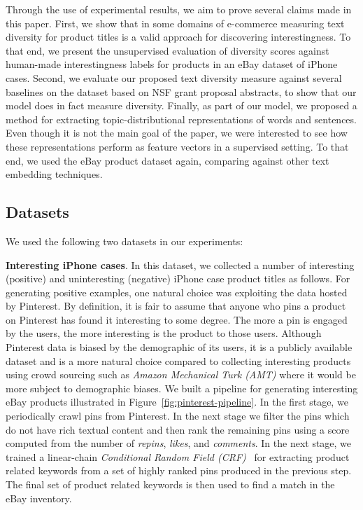

Through the use of experimental results, we aim to prove several
claims made in this paper. First, we show that in some domains of
e-commerce measuring text diversity for product titles is a valid
approach for discovering interestingness. To that end, we present the
unsupervised evaluation of diversity scores against human-made
interestingness labels for products in an eBay dataset of iPhone
cases. Second, we evaluate our proposed text diversity measure against
several baselines on the dataset based on NSF grant proposal
abstracts, to show that our model does in fact measure
diversity. Finally, as part of our model, we proposed a method for
extracting topic-distributional representations of words and
sentences. Even though it is not the main goal of the paper, we were
interested to see how these representations perform as feature vectors
in a supervised setting. To that end, we used the eBay product
dataset again, comparing against other text embedding techniques.

\subsection{Datasets}
\label{sec:datasets}

We used the following two datasets in our experiments: 

{\bf Interesting iPhone cases}.
In this dataset, we collected a number of interesting (positive) and uninteresting (negative) iPhone case product titles as follows. For generating positive examples, one natural choice was exploiting the data hosted by Pinterest. By definition, it is fair to assume that anyone who pins a product on Pinterest has found it interesting to some degree. The more a pin is engaged by the users, the more interesting is the product to those users. Although Pinterest data is biased by the demographic of its users, it is a publicly available dataset and is a more natural choice compared to collecting interesting products using crowd sourcing such as  {\em Amazon Mechanical Turk (AMT)} where it would be more subject to demographic biases. We built a pipeline for generating interesting eBay products illustrated in Figure~\ref{fig:pinterest-pipeline}.  In the first stage, we periodically crawl pins from Pinterest. In the next stage we filter the pins which do not have rich textual content and then rank the remaining pins using a score computed from the number of {\em repins}, {\em likes}, and {\em comments}. In the next stage, we trained a linear-chain {\em Conditional Random Field (CRF)}~\cite{Lafferty:2001:CRF:645530.655813} for extracting product related keywords from a set of highly ranked pins produced in the previous step. The final set of product related keywords  is then used to find a match in the eBay inventory. 

